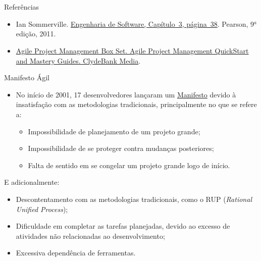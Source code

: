\def\agileboxref{\href{https://goo.gl/mmWyZF}{Agile Project Management Box
      Set. Agile Project Management QuickStart and Mastery
      Guides. ClydeBank Media}.}

\lecturetitle{\insertlecture}{\course}

\frame{\maketitle}

\section{\insertlecture}

\begin{frame}{Referências}

  \begin{itemize}
  \item Ian
    Sommerville. \href{https://feituverava.bv3.digitalpages.com.br/users/publications/9788579361081/pages/39}{Engenharia
      de Software, Capítulo~3, página~38}. Pearson, 9$^a$ edição, 2011.
  \item \agileboxref
  \end{itemize}
\end{frame}

\begin{frame}{Manifesto Ágil}
  \begin{itemize}[<+-| alert@+>]
  \item No início de 2001, 17 desenvolvedores lançaram um
    \href{http://agilemanifesto.org/}{Manifesto} devido à insatisfação com 
    as metodologias tradicionais, principalmente no que se refere a:
    \begin{itemize}[<+-| alert@+>]
    \item Impossibilidade de planejamento de um projeto grande;
    \item Impossibilidade de se proteger contra mudanças posteriores;
    \item Falta de sentido em se congelar um projeto grande logo de início.
    \end{itemize}
  \end{itemize}

  \pause\bigskip
  E adicionalmente:
  \begin{itemize}[<+-| alert@+>]
  \item Descontentamento com as metodologias tradicionais, como 
    o RUP ({\em Rational Unified Process});
  \item Dificuldade em completar as tarefas planejadas, devido ao excesso 
    de atividades não relacionadas ao desenvolvimento;
  \item Excessiva dependência de ferramentas.
  \end{itemize}
\end{frame}

